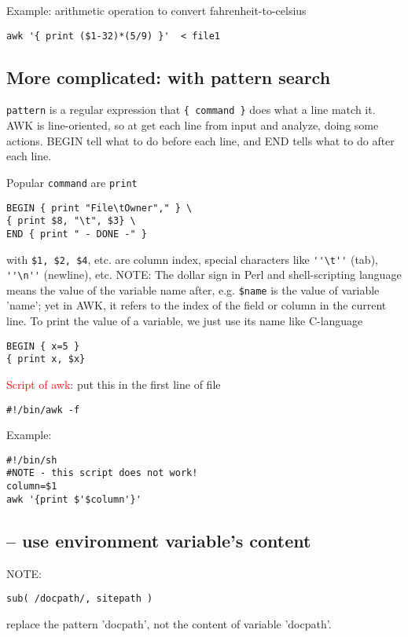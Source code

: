 Example: arithmetic operation to convert fahrenheit-to-celsius
\begin{verbatim}
awk '{ print ($1-32)*(5/9) }'  < file1  
\end{verbatim}

\subsection{More complicated: with pattern search}
\label{sec:awk-pattern-search}

\verb!pattern! is a regular expression that \verb!{ command }! does what a line
match it. AWK is line-oriented, so at get each line from input and analyze,
doing some actions. BEGIN tell what to do before each line, and END tells what
to do after each line. 

Popular \verb!command! are \verb!print!
\begin{verbatim}
BEGIN { print "File\tOwner"," } \ 
{ print $8, "\t", $3} \
END { print " - DONE -" }
\end{verbatim} 
with \verb!$1, $2, $4!, etc. are column index, special characters like
\verb!''\t''! (tab), \verb!''\n''! (newline), etc. NOTE: The dollar sign in Perl
and shell-scripting language means the value of the variable name after, e.g.
\verb!$name! is the value of variable 'name'; yet in AWK, it refers to the index
of the field or column in the current line. To print the value of a variable,
we just use its name like C-language
\begin{verbatim}
BEGIN { x=5 }
{ print x, $x}
\end{verbatim}


\textcolor{red}{Script of awk}: put this in the first line of file
\begin{verbatim}
#!/bin/awk -f
\end{verbatim}

Example:
\begin{verbatim}
#!/bin/sh
#NOTE - this script does not work!
column=$1
awk '{print $'$column'}'
\end{verbatim}



\subsection{-- use environment variable's content}

NOTE:
\begin{verbatim}
sub( /docpath/, sitepath )
\end{verbatim}
replace the pattern 'docpath', not the content of variable 'docpath'. 


